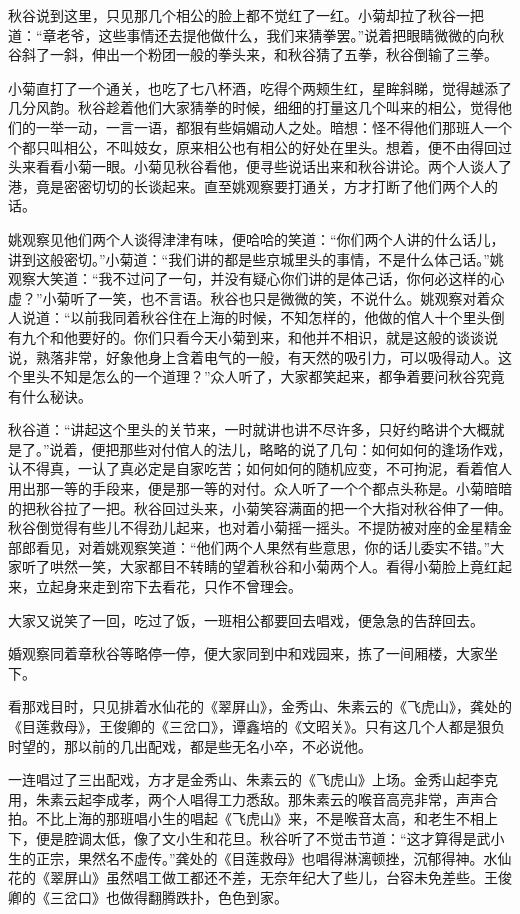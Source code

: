 \documentclass[12pt,UTF8]{ctexbook}
\begin{document}
{{{秋谷说到这里，只见那几个相公的脸上都不觉红了一红。小菊却拉了秋谷一把道：“章老爷，这些事情还去提他做什么，我们来猜拳罢。”说着把眼睛微微的向秋谷斜了一斜，伸出一个粉团一般的拳头来，和秋谷猜了五拳，秋谷倒输了三拳。

小菊直打了一个通关，也吃了七八杯酒，吃得个两颊生红，星眸斜睇，觉得越添了几分风韵。秋谷趁着他们大家猜拳的时候，细细的打量这几个叫来的相公，觉得他们的一举一动，一言一语，都狠有些娟媚动人之处。暗想：怪不得他们那班人一个个都只叫相公，不叫妓女，原来相公也有相公的好处在里头。想着，便不由得回过头来看看小菊一眼。小菊见秋谷看他，便寻些说话出来和秋谷讲论。两个人谈人了港，竟是密密切切的长谈起来。直至姚观察要打通关，方才打断了他们两个人的话。

姚观察见他们两个人谈得津津有味，便哈哈的笑道：“你们两个人讲的什么话儿，讲到这般密切。”小菊道：“我们讲的都是些京城里头的事情，不是什么体己话。”姚观察大笑道：“我不过问了一句，并没有疑心你们讲的是体己话，你何必这样的心虚？”小菊听了一笑，也不言语。秋谷也只是微微的笑，不说什么。姚观察对着众人说道：“以前我同着秋谷住在上海的时候，不知怎样的，他做的倌人十个里头倒有九个和他要好的。你们只看今天小菊到来，和他并不相识，就是这般的谈谈说说，熟落非常，好象他身上含着电气的一般，有天然的吸引力，可以吸得动人。这个里头不知是怎么的一个道理？”众人听了，大家都笑起来，都争着要问秋谷究竟有什么秘诀。

秋谷道：“讲起这个里头的关节来，一时就讲也讲不尽许多，只好约略讲个大概就是了。”说着，便把那些对付倌人的法儿，略略的说了几句：如何如何的逢场作戏，认不得真，一认了真必定是自家吃苦；如何如何的随机应变，不可拘泥，看着倌人用出那一等的手段来，便是那一等的对付。众人听了一个个都点头称是。小菊暗暗的把秋谷拉了一把。秋谷回过头来，小菊笑容满面的把一个大指对秋谷伸了一伸。秋谷倒觉得有些儿不得劲儿起来，也对着小菊摇一摇头。不提防被对座的金星精金部郎看见，对着姚观察笑道：“他们两个人果然有些意思，你的话儿委实不错。”大家听了哄然一笑，大家都目不转睛的望着秋谷和小菊两个人。看得小菊脸上竟红起来，立起身来走到帘下去看花，只作不曾理会。

大家又说笑了一回，吃过了饭，一班相公都要回去唱戏，便急急的告辞回去。

婚观察同着章秋谷等略停一停，便大家同到中和戏园来，拣了一间厢楼，大家坐下。

看那戏目时，只见排着水仙花的《翠屏山》，金秀山、朱素云的《飞虎山》，龚处的《目莲救母》，王俊卿的《三岔口》，谭鑫培的《文昭关》。只有这几个人都是狠负时望的，那以前的几出配戏，都是些无名小卒，不必说他。

一连唱过了三出配戏，方才是金秀山、朱素云的《飞虎山》上场。金秀山起李克用，朱素云起李成孝，两个人唱得工力悉敌。那朱素云的喉音高亮非常，声声合拍。不比上海的那班唱小生的唱起《飞虎山》来，不是喉音太高，和老生不相上下，便是腔调太低，像了文小生和花旦。秋谷听了不觉击节道：“这才算得是武小生的正宗，果然名不虚传。”龚处的《目莲救母》也唱得淋漓顿挫，沉郁得神。水仙花的《翠屏山》虽然唱工做工都还不差，无奈年纪大了些儿，台容未免差些。王俊卿的《三岔口》也做得翻腾跌扑，色色到家。

}}}
\end{document}

